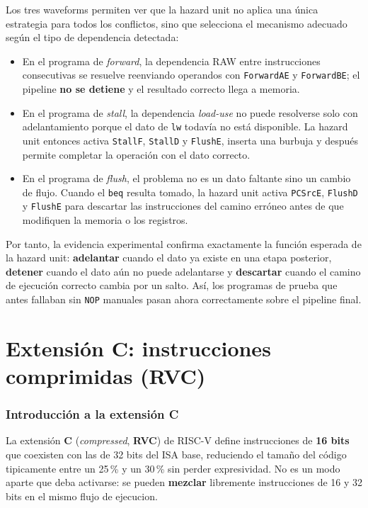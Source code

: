 \documentclass[11pt,a4paper]{article}
\begin{document}
Los tres waveforms permiten ver que la hazard unit no aplica una única estrategia para
todos los conflictos, sino que selecciona el mecanismo adecuado según el tipo de
dependencia detectada:

\begin{itemize}
	\item En el programa de \textit{forward}, la dependencia RAW entre instrucciones
	      consecutivas se resuelve reenviando operandos con \texttt{ForwardAE} y
	      \texttt{ForwardBE}; el pipeline \textbf{no se detiene} y el resultado correcto
	      llega a memoria.
	\item En el programa de \textit{stall}, la dependencia \textit{load-use} no puede
	      resolverse solo con adelantamiento porque el dato de \texttt{lw} todavía no está
	      disponible. La hazard unit entonces activa \texttt{StallF}, \texttt{StallD} y
	      \texttt{FlushE}, inserta una burbuja y después permite completar la operación con
	      el dato correcto.
	\item En el programa de \textit{flush}, el problema no es un dato faltante sino un
	      cambio de flujo. Cuando el \texttt{beq} resulta tomado, la hazard unit activa
	      \texttt{PCSrcE}, \texttt{FlushD} y \texttt{FlushE} para descartar las
	      instrucciones del camino erróneo antes de que modifiquen la memoria o los
	      registros.
\end{itemize}

Por tanto, la evidencia experimental confirma exactamente la función esperada de la
hazard unit: \textbf{adelantar} cuando el dato ya existe en una etapa posterior,
\textbf{detener} cuando el dato aún no puede adelantarse y \textbf{descartar} cuando el
camino de ejecución correcto cambia por un salto. Así, los programas de prueba que antes
fallaban sin \texttt{NOP} manuales pasan ahora correctamente sobre el pipeline final.

\part{Extensión C: instrucciones comprimidas (RVC)}

\section{Introducción a la extensión C}

La extensión \textbf{C} (\textit{compressed}, \textbf{RVC}) de RISC-V define
instrucciones de \textbf{16 bits} que coexisten con las de 32 bits del ISA base,
reduciendo el tamaño del código tipicamente entre un 25\,\% y un 30\,\% sin perder
expresividad. No es un modo aparte que deba activarse: se pueden \textbf{mezclar}
libremente instrucciones de 16 y 32 bits en el mismo flujo de ejecucion.
\end{document}
